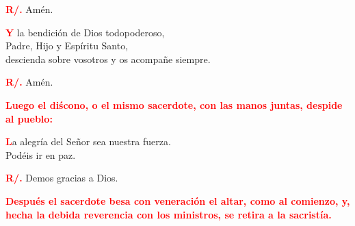 \documentclass[12pt, letterpaper]{report}
\begin{document}
\noindent
\Large {\bfseries \textcolor{red}{R/.}} \hspace{0.5cm} Am\'en.

\lettrine[lines=1]{\bfseries \textcolor{red}{Y}}{} \Large la bendici\'on de Dios todopoderoso, \\
Padre, Hijo \Huge{\textcolor{red}{}} \Large y Esp\'iritu Santo, \\
descienda sobre vosotros y os acompa\~ne siempre. \newline

\noindent
\Large {\bfseries \textcolor{red}{R/.}} \hspace{0.5cm} Am\'en.\newline

\newpage

\large{\bfseries \textcolor{red}{Luego el di\'scono, o el mismo sacerdote, con las manos juntas, despide al pueblo:}}

\lettrine[lines=1]{\bfseries \textcolor{red}{L}}{}\Large a alegr\'ia del Se\~nor sea nuestra fuerza. \\
Pod\'eis ir en paz. \newline

\noindent
\Large {\bfseries \textcolor{red}{R/.}} \hspace{0.5cm} Demos gracias a Dios. \newline

\large{\bfseries \textcolor{red}{Despu\'es el sacerdote besa con veneraci\'on el altar, como al comienzo, y, hecha la debida reverencia con los ministros, se retira a la sacrist\'ia.}}\newline

\end{document}
